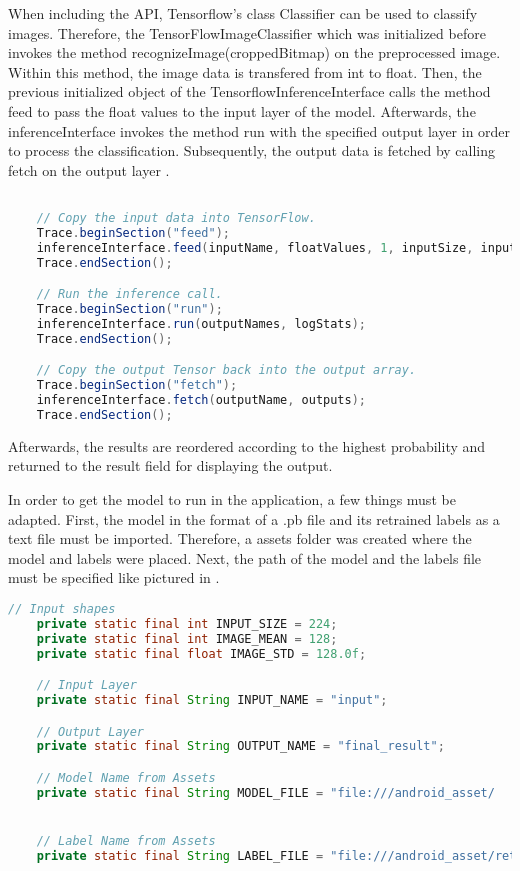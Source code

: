 When including the API, Tensorflow's class Classifier can be used to classify images. Therefore, the TensorFlowImageClassifier which was initialized before invokes the method recognizeImage(croppedBitmap) on the preprocessed image. Within this method, the image data is transfered from int to float. Then, the previous initialized object of the TensorflowInferenceInterface calls the method feed to pass the float values to the input layer of the model. Afterwards, the inferenceInterface invokes the method run with the specified output layer in order to process the classification. Subsequently, the output data is fetched by calling fetch on the output layer .

\begin{lstlisting}[caption=Classifying images by the inferenceInterface, label=list:classify_android, language=java]

    // Copy the input data into TensorFlow.
    Trace.beginSection("feed");
    inferenceInterface.feed(inputName, floatValues, 1, inputSize, inputSize, 3);
    Trace.endSection();

    // Run the inference call.
    Trace.beginSection("run");
    inferenceInterface.run(outputNames, logStats);
    Trace.endSection();

    // Copy the output Tensor back into the output array.
    Trace.beginSection("fetch");
    inferenceInterface.fetch(outputName, outputs);
    Trace.endSection();
\end{lstlisting}

Afterwards, the results are reordered according to the highest probability and returned to the result field for displaying the output.

In order to get the model to run in the application, a few things must be adapted. First, the model in the format of a .pb file and its retrained labels as a text file must be imported. Therefore, a assets folder was created where the model and labels were placed. Next, the path of the model and the labels file must be specified like pictured in .

\begin{lstlisting}[caption=Including the model in the mobile application, label=list:include_model, language=java]
    // Input shapes
    private static final int INPUT_SIZE = 224;
    private static final int IMAGE_MEAN = 128;
    private static final float IMAGE_STD = 128.0f;

    // Input Layer
    private static final String INPUT_NAME = "input";

    // Output Layer
    private static final String OUTPUT_NAME = "final_result";

    // Model Name from Assets
    private static final String MODEL_FILE = "file:///android_asset/				opt4_retrained_dog_graph_mobilenet_0.50_224_700_0.007.pb";


    // Label Name from Assets
    private static final String LABEL_FILE = "file:///android_asset/retrained_dog_labels_mobilenet_0.50_224_700_0.007.txt";

\end{lstlisting}


